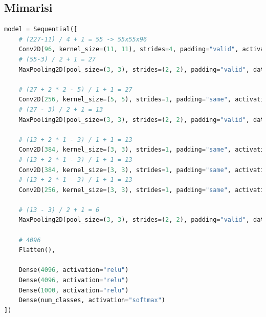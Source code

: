 \subsection{Mimarisi}
\begin{lstlisting}[language=Python]
model = Sequential([
	# (227-11) / 4 + 1 = 55 -> 55x55x96
	Conv2D(96, kernel_size=(11, 11), strides=4, padding="valid", activation="relu", input_shape=input_shape),
	# (55-3) / 2 + 1 = 27
	MaxPooling2D(pool_size=(3, 3), strides=(2, 2), padding="valid", data_format=None)

	# (27 + 2 * 2 - 5) / 1 + 1 = 27
	Conv2D(256, kernel_size=(5, 5), strides=1, padding="same", activation="relu", kernel_initializer="he_normal")
	# (27 - 3) / 2 + 1 = 13
	MaxPooling2D(pool_size=(3, 3), strides=(2, 2), padding="valid", data_format=None)

	# (13 + 2 * 1 - 3) / 1 + 1 = 13
	Conv2D(384, kernel_size=(3, 3), strides=1, padding="same", activation="relu", kernel_initializer="he_normal")
	# (13 + 2 * 1 - 3) / 1 + 1 = 13
	Conv2D(384, kernel_size=(3, 3), strides=1, padding="same", activation="relu", kernel_initializer="he_normal")
	# (13 + 2 * 1 - 3) / 1 + 1 = 13
	Conv2D(256, kernel_size=(3, 3), strides=1, padding="same", activation="relu", kernel_initializer="he_normal")

	# (13 - 3) / 2 + 1 = 6
	MaxPooling2D(pool_size=(3, 3), strides=(2, 2), padding="valid", data_format=None)

	# 4096
	Flatten(),

	Dense(4096, activation="relu")
	Dense(4096, activation="relu")
	Dense(1000, activation="relu")
	Dense(num_classes, activation="softmax")
])
\end{lstlisting}

\newpage